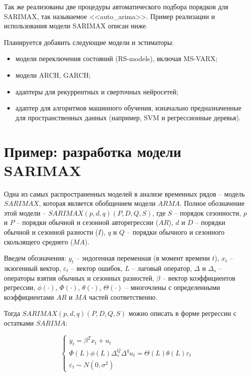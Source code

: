 \documentclass[a4paper,14pt]{extreport}
\begin{document}
	Так же реализованы две процедуры автоматического подбора порядков для SARIMAX, так называемое <<auto\_arima>>\cite{pyramid_arima}. Пример реализации и использования модели SARIMAX описан ниже.
	
	Планируется добавить следующие модели и эстиматоры:
	\begin{itemize}
		\item модели переключения состояний (RS-models), включая MS-VARX;
		\item модели ARCH, GARCH;
		\item адаптеры для рекуррентных и сверточных нейросетей;
		\item адаптер для алгоритмов машинного обучения, изначально предназначенные для пространственных данных (например, SVM и регрессионные деревья).
	\end{itemize}
	
	
	\section{Пример: разработка модели SARIMAX}
	
	Одна из самых распространенных моделей в анализе временных рядов -- модель $SARIMAX$, которая является обобщением модели $ARMA$. Полное обозначение этой модели -- $SARIMAX(p,d,q)(P,D,Q,S)$, где $S$ -- порядок сезонности, $p$ и $P$ -- порядки обычной и сезонной авторегрессии ($AR$), $d$ и $D$ -- порядки обычной и сезонной разности ($I$), $q$ и $Q$ -- порядки обычного и сезонного скользящего среднего ($MA$).
	
	Введем обозначения:
	$y_t$ -- эндогенная переменная (в момент времени $t$), 
	$x_t$ -- экзогенный вектор, 
	$\varepsilon_t$ -- вектор ошибок, 
	$L$ -- лаговый оператор, 
	$\Delta$ и $\Delta_s$ -- операторы взятия обычных и сезонных разностей, 
	$\beta$ -- вектор коэффициентов регрессии, 
	$\phi(\cdot)$, $\Phi(\cdot)$, $\theta(\cdot)$, $\Theta(\cdot)$ -- многочлены с определенными коэффициентами $AR$ и $MA$ частей соответственно.
	
	Тогда $SARIMAX(p,d,q)(P,D,Q,S)$ можно описать в форме регрессии с остатками $SARIMA$:
	
	\begin{equation}
	\begin{cases}
	y_t = \beta^{T} x_t + u_t \\
	\Phi(L) \phi(L) \Delta_s^{Q} \Delta^{q} u_t = \Theta(L) \theta(L) \varepsilon_t \\
	\varepsilon_t \sim N(0,\sigma^{2})
	\end{cases}
	\label{eq:sarimax_canonical}
	\end{equation}
	
\end{document}
